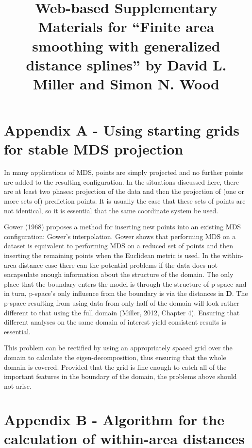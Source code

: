 \documentclass{article}
\begin{document}
\title{Web-based Supplementary Materials for ``Finite area smoothing with generalized distance splines'' by David L. Miller and Simon N. Wood}

\maketitle

\section*{Appendix A - Using starting grids for stable MDS projection}

In many applications of MDS, points are simply projected and no further points are added to the resulting configuration. In the situations discussed here, there are at least two phases: projection of the data and then the projection of (one or more sets of) prediction points. It is usually the case that these sets of points are not identical, so it is essential that the same coordinate system be used.

Gower (1968) proposes a method for inserting new points into an existing MDS configuration: Gower's interpolation. Gower shows that performing MDS on a dataset is equivalent to performing MDS on a reduced set of points and then inserting the remaining points when the Euclidean metric is used. In the within-area distance case there can the potential problems if the data does not encapsulate enough information about the structure of the domain. The only place that the boundary enters the model is through the structure of p-space and in turn, p-space's only influence from the boundary is via the distances in $\mathbf{D}$. The p-space resulting from using data from only half of the domain will look rather different to that using the full domain (Miller, 2012, Chapter 4). Ensuring that different analyses on the same domain of interest yield consistent results is essential.

This problem can be rectified by using an appropriately spaced grid over the domain to calculate the eigen-decomposition, thus ensuring that the whole domain is covered. Provided that the grid is fine enough to catch all of the important features in the boundary of the domain, the problems above should not arise.

\newpage

\section*{Appendix B - Algorithm for the calculation of within-area distances}
\end{document}
